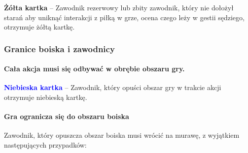 \documentclass[12pt]{article}
\newcommand\yellowcard[1]{\bgroup\textcolor{darkyellow}{\textbf{#1}}}
\newcommand\bluecard[1]{\bgroup\textcolor{blue}{\textbf{#1}}}
\begin{document}
\yellowcard{Żółta kartka} -- Zawodnik rezerwowy lub zbity zawodnik, który nie
dołożył starań aby uniknąć interakcji z piłką w grze, ocena czego leży w
gestii sędziego, otrzymuje żółtą kartkę.

\subsubsection{Granice boiska i zawodnicy}

\paragraph{Cała akcja musi się odbywać w obrębie obszaru gry.}

\bluecard{Niebieska kartka} -- Zawodnik, który opuści obszar gry w trakcie
akcji otrzymuje niebieską kartkę.

\paragraph{Gra ogranicza się do obszaru boiska}
Zawodnik, który
opuszcza obszar boiska musi wrócić na murawę, z wyjątkiem następujących
przypadków:
\end{document}

